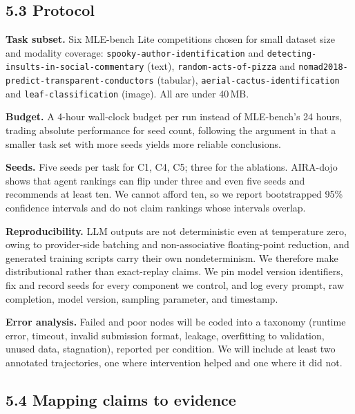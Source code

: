 \documentclass[11pt]{article}
\begin{document}
\subsection*{5.3 Protocol}

\textbf{Task subset.} Six MLE-bench Lite competitions chosen for small dataset size
and modality coverage: \texttt{spooky-author-identification} and
\texttt{detecting-insults-in-social-commentary} (text), \texttt{random-acts-of-pizza}
and \texttt{nomad2018-predict-transparent-conductors} (tabular),
\texttt{aerial-cactus-identification} and \texttt{leaf-classification} (image). All
are under 40\,MB.

\textbf{Budget.} A 4-hour wall-clock budget per run instead of MLE-bench's 24 hours,
trading absolute performance for seed count, following the argument in \cite{aira}
that a smaller task set with more seeds yields more reliable conclusions.

\textbf{Seeds.} Five seeds per task for C1, C4, C5; three for the ablations.
AIRA-dojo \cite{aira} shows that agent rankings can flip under three and even five
seeds and recommends at least ten. We cannot afford ten, so we report bootstrapped
95\% confidence intervals and do not claim rankings whose intervals overlap.

\textbf{Reproducibility.} LLM outputs are not deterministic even at temperature zero,
owing to provider-side batching and non-associative floating-point reduction, and
generated training scripts carry their own nondeterminism. We therefore make
distributional rather than exact-replay claims. We pin model version identifiers,
fix and record seeds for every component we control, and log every prompt, raw
completion, model version, sampling parameter, and timestamp.

\textbf{Error analysis.} Failed and poor nodes will be coded into a taxonomy (runtime
error, timeout, invalid submission format, leakage, overfitting to validation,
unused data, stagnation), reported per condition. We will include at least two
annotated trajectories, one where intervention helped and one where it did not.

\subsection*{5.4 Mapping claims to evidence}
\end{document}
